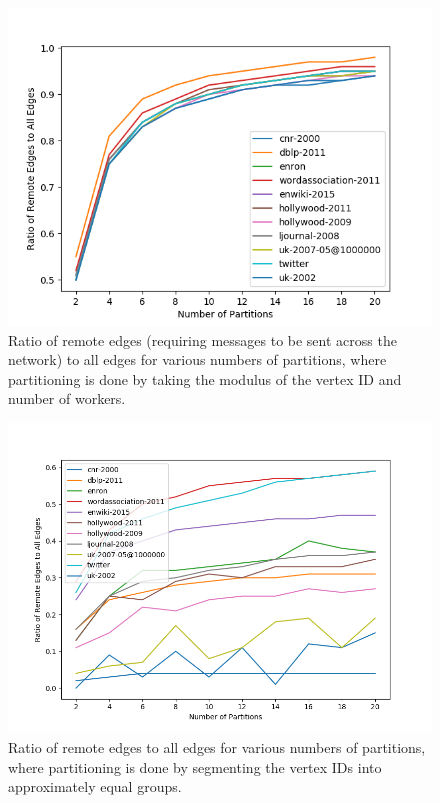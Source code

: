 \begin{figure}
	\centering
	\includegraphics[width=\columnwidth]{../good_plots/remote_to_all_modulo.png}
	\caption{Ratio of remote edges (requiring messages to be sent across the 
	network) to all edges for various numbers of partitions, where partitioning 
	is done by taking the modulus of the vertex ID and number of workers.}
	\label{fig:remote_to_all_mod}
\end{figure}

\begin{figure}
	\centering
	\includegraphics[width=\columnwidth]{../good_plots/remote_to_all_chunked.png}
	\caption{Ratio of remote edges to all edges for various numbers of 
		partitions, where partitioning is done by segmenting the vertex IDs 
		into 
		approximately equal groups.}
	\label{fig:remote_to_all_range}
\end{figure}

